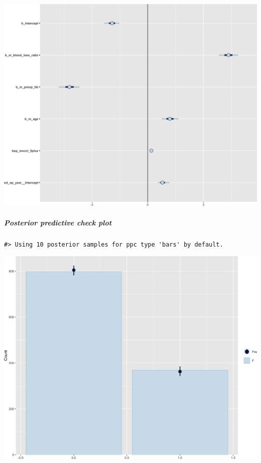 \documentclass[
]{article}
\begin{document}
\begin{center}\includegraphics[width=1\linewidth]{notebook_files/figure-latex/model1reduced_diagnostics-2} \end{center}

\hypertarget{posterior-predictive-check-plot-1}{%
\subparagraph{Posterior predictive check plot}\label{posterior-predictive-check-plot-1}}

\begin{verbatim}
#> Using 10 posterior samples for ppc type 'bars' by default.
\end{verbatim}

\begin{center}\includegraphics[width=1\linewidth]{notebook_files/figure-latex/model1reduced_ppcheck-1} \end{center}
\end{document}
